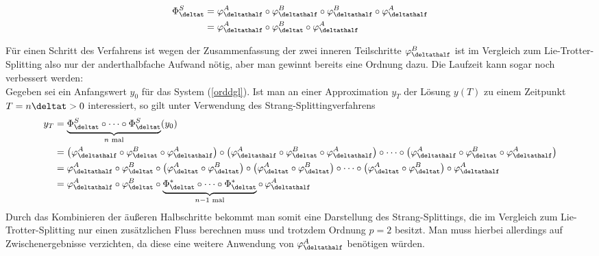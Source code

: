 \noindent\begin{minipage}{0.3\textwidth}

\end{minipage}%
\hfill%
\begin{minipage}{0.7\textwidth}
\begin{align}
\Phi_{\deltat}^S&=\varphi_{\deltathalf}^A\circ\varphi_{\deltathalf}^B\circ\varphi_{\deltathalf}^B\circ\varphi_{\deltathalf}^A\nonumber\\
&=\varphi_{\deltathalf}^A\circ\varphi_{\deltat}^B\circ\varphi_{\deltathalf}^A
\end{align}
\end{minipage}
Für einen Schritt des Verfahrens ist wegen der Zusammenfassung der zwei inneren Teilschritte $\varphi_{\deltathalf}^B$ ist im Vergleich zum Lie-Trotter-Splitting also nur der anderthalbfache Aufwand nötig, aber man gewinnt bereits eine Ordnung dazu. Die Laufzeit kann sogar noch verbessert werden:\\
Gegeben sei ein Anfangswert $y_0$ für das System (\ref{orddgl}). Ist man an einer Approximation $y_T$ der Lösung $y(T)$ zu einem Zeitpunkt $T=n\deltat>0$ interessiert, so gilt unter Verwendung des Strang-Splittingverfahrens
\begin{align*}
y_T&=\underbrace{\Phi_{\deltat}^S\circ\dots\circ\Phi_{\deltat}^S}_{n\text{ mal}}(y_0)\\
&=\left(\varphi_{\deltathalf}^A\circ\varphi_{\deltat}^B\circ\varphi_{\deltathalf}^A\right)\circ\left(
\varphi_{\deltathalf}^A\circ\varphi_{\deltat}^B\circ\varphi_{\deltathalf}^A\right)\circ\dots\circ\left(
\varphi_{\deltathalf}^A\circ\varphi_{\deltat}^B\circ\varphi_{\deltathalf}^A\right)\\
&=\varphi_{\deltathalf}^A\circ\varphi_{\deltat}^B\circ\left(\varphi_{\deltat}^A\circ\varphi_{\deltat}^B\right)\circ\left(\varphi_{\deltat}^A\circ\varphi_{\deltat}^B\right)\circ\dots\circ\left(\varphi_{\deltat}^A\circ\varphi_{\deltat}^B\right)\circ\varphi_{\deltathalf}^A\\
&=\varphi_{\deltathalf}^A\circ\varphi_{\deltat}^B\circ
\underbrace{\Phi_{\deltat}^*\circ\dots\circ\Phi_{\deltat}^*}_{n-1\text{ mal}}\circ\,\varphi_{\deltathalf}^A
\end{align*}
Durch das Kombinieren der äußeren Halbschritte bekommt man somit eine Darstellung des Strang-Splittings, die im Vergleich zum Lie-Trotter-Splitting nur einen zusätzlichen Fluss berechnen muss und trotzdem Ordnung $p=2$ besitzt. Man muss hierbei allerdings auf Zwischenergebnisse verzichten, da diese eine weitere Anwendung von $\varphi_{\deltathalf}^A$ benötigen würden.\\[0.5cm]
